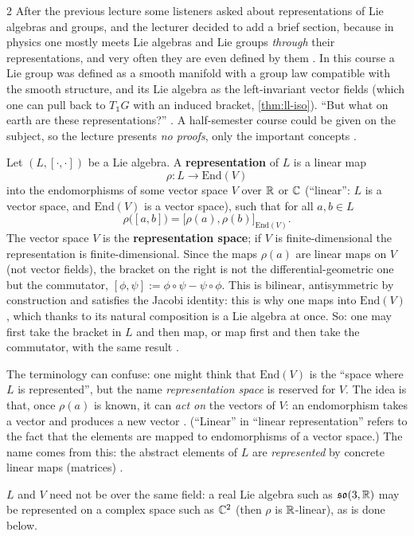\begin{paracol}{2}
After the previous lecture some listeners asked about representations of Lie algebras and groups, and the lecturer decided to add a brief section, because in physics one mostly meets Lie algebras and Lie groups \emph{through} their representations, and very often they are even defined by them  . In this course a Lie group was defined as a smooth manifold with a group law compatible with the smooth structure, and its Lie algebra as the left-invariant vector fields (which one can pull back to $T_{\mathbb 1}G$ with an induced bracket, \cref{thm:ll-iso}). ``But what on earth are these representations?'' . A half-semester course could be given on the subject, so the lecture presents \emph{no proofs}, only the important concepts   .

\begin{definition}\label{def:rp-rep}
Let $(L,[\cdot,\cdot])$ be a Lie algebra. A \textbf{representation} of $L$ is a linear map
\[
  \rho\colon L\to\mathrm{End}(V)
\]
into the endomorphisms of some vector space $V$ over $\mathbb{R}$ or $\mathbb{C}$ (``linear'': $L$ is a vector space, and $\mathrm{End}(V)$ is a vector space), such that for all $a,b\in L$
\[
  \rho\bigl([a,b]\bigr)=\bigl[\rho(a),\rho(b)\bigr]_{\mathrm{End}(V)} .
\]
The vector space $V$ is the \textbf{representation space}; if $V$ is finite-dimensional the representation is finite-dimensional. Since the maps $\rho(a)$ are linear maps on $V$ (not vector fields), the bracket on the right is not the differential-geometric one but the commutator, $[\phi,\psi]:=\phi\circ\psi-\psi\circ\phi$. This is bilinear, antisymmetric by construction and satisfies the Jacobi identity: this is why one maps into $\mathrm{End}(V)$, which thanks to its natural composition is a Lie algebra at once. So: one may first take the bracket in $L$ and then map, or map first and then take the commutator, with the same result      .
\end{definition}
The terminology can confuse: one might think that $\mathrm{End}(V)$ is the ``space where $L$ is represented'', but the name \emph{representation space} is reserved for $V$. The idea is that, once $\rho(a)$ is known, it can \emph{act on} the vectors of $V$: an endomorphism takes a vector and produces a new vector   . (``Linear'' in ``linear representation'' refers to the fact that the elements are mapped to endomorphisms of a vector space.) The name comes from this: the abstract elements of $L$ are \emph{represented} by concrete linear maps (matrices) .
\begin{coursenote}
$L$ and $V$ need not be over the same field: a real Lie algebra such as $\mathfrak{so}(3,\mathbb{R})$ may be represented on a complex space such as $\mathbb{C}^2$ (then $\rho$ is $\mathbb{R}$-linear), as is done below. 
\end{coursenote}


\end{paracol}

